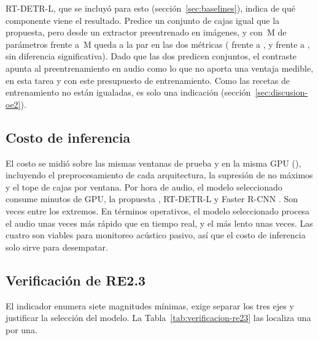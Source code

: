 RT-DETR-L, que se incluyó para esto (sección~\ref{sec:baselines}), indica de qué
componente viene el resultado. Predice un conjunto de cajas igual que la
propuesta, pero desde un extractor preentrenado en imágenes, y con
\cParamsRtd{}\,M de parámetros frente a \cParamsDet{}\,M queda a la par en las dos
métricas (\rRecallRtd{} frente a \rRecallDet{}, y \rMapRtd{} frente a
\rMapDet{}, sin diferencia significativa). Dado que las dos predicen conjuntos, el contraste apunta al
preentrenamiento en audio como lo que no aporta una ventaja medible, en esta
tarea y con este presupuesto de entrenamiento. Como las recetas de
entrenamiento no están igualadas, es solo una indicación
(sección~\ref{sec:discusion-oe2}).

\subsection{Costo de inferencia}
\label{sec:costo-inferencia}

El costo se midió sobre las mismas \rTimingWindows{} ventanas de prueba y en la
misma GPU (\rGpuName{}), incluyendo el preprocesamiento de cada arquitectura, la
supresión de no máximos y el tope de \mMaxDet{} cajas por ventana. Por hora de
audio, el modelo seleccionado consume \rGpuMinYol{} minutos de GPU, la propuesta
\rGpuMinDet{}, RT-DETR-L \rGpuMinRtd{} y Faster R-CNN \rGpuMinFrc{}. Son
\rCostRatio{} veces entre los extremos. En términos operativos, el modelo
seleccionado procesa el audio unas \rRealtimeYol{} veces más rápido que en tiempo
real, y el más lento unas \rRealtimeFrc{} veces. Las cuatro son viables para
monitoreo acústico pasivo, así que el costo de inferencia solo sirve para
desempatar.

\subsection{Verificación de RE2.3}
\label{sec:verificacion-re23}

El indicador enumera siete magnitudes mínimas, exige separar los tres ejes y
justificar la selección del modelo. La Tabla~\ref{tab:verificacion-re23} las
localiza una por una.

